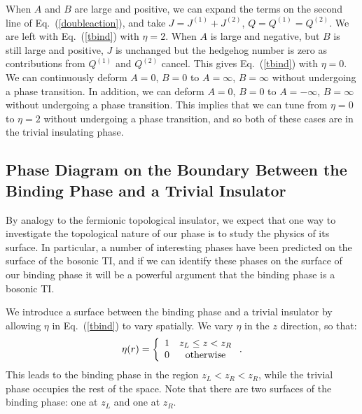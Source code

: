 \documentclass[prb,twocolumn]{revtex4-1}
\begin{document}
When $A$ and $B$ are large and positive, we can expand the terms on the second line of Eq.~(\ref{doubleaction}), and take $J=J^{(1)}+J^{(2)}$, $Q=Q^{(1)}=Q^{(2)}$. We are left with Eq.~(\ref{tbind}) with $\eta=2$. When $A$ is large and negative, but $B$ is still large and positive, $J$ is unchanged but the hedgehog number is zero as contributions from $Q^{(1)}$ and $Q^{(2)}$ cancel. This gives Eq.~(\ref{tbind}) with $\eta=0$.
We can continuously deform $A=0$, $B=0$ to $A=\infty$, $B=\infty$ without undergoing a phase transition. In addition, we can deform $A=0$, $B=0$ to $A=-\infty$, $B=\infty$ without undergoing a phase transition. This implies that we can tune from $\eta=0$ to $\eta=2$ without undergoing a phase transition, and so both of these cases are in the trivial insulating phase.


\subsection{Phase Diagram on the Boundary Between the Binding Phase and a Trivial Insulator}
\label{subsec:heissurf}
By analogy to the fermionic topological insulator, we expect that one way to investigate the topological nature of our phase is to study the physics of its surface. In particular, a number of interesting phases have been predicted on the surface of the bosonic TI,\cite{SenthilVishwanath} and if we can identify these phases on the surface of our binding phase it will be a powerful argument that the binding phase is a bosonic TI.

We introduce a surface between the binding phase and a trivial insulator by allowing $\eta$ in Eq.~(\ref{tbind}) to vary spatially.
We vary $\eta$ in the $z$ direction, so that:
\begin{equation}
\eta(r)=
\left\{ \begin{array}{cc}
1 & z_L\leq z<z_R\\
0 & \rm{otherwise}\\
\end{array}\right..
\end{equation}
This leads to the binding phase in the region $z_L<z_R<z_R$, while the trivial phase occupies the rest of the space. Note that there are two surfaces of the binding phase: one at $z_L$ and one at $z_R$.
\end{document}
